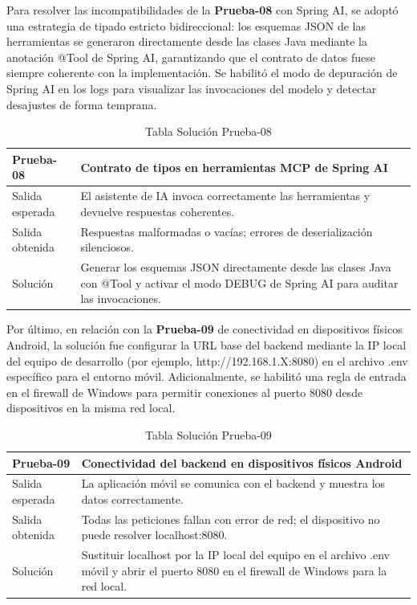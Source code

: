Para resolver las incompatibilidades de la \textbf{Prueba-08} con Spring AI, se adoptó una estrategia de tipado estricto bidireccional: los esquemas JSON de las herramientas se generaron directamente desde las clases Java mediante la anotación @Tool de Spring AI, garantizando que el contrato de datos fuese siempre coherente con la implementación. Se habilitó el modo de depuración de Spring AI en los logs para visualizar las invocaciones del modelo y detectar desajustes de forma temprana.

\begin{table}[H]
\centering
\begin{tabular}{|p{}|p{}|}
\hline
\textbf{Prueba-08} & \textbf{Contrato de tipos en herramientas MCP de Spring AI} \\ \hline
Salida esperada & El asistente de IA invoca correctamente las herramientas y devuelve respuestas coherentes. \\ \hline
Salida obtenida & Respuestas malformadas o vacías; errores de deserialización silenciosos. \\ \hline
Solución & Generar los esquemas JSON directamente desde las clases Java con @Tool y activar el modo DEBUG de Spring AI para auditar las invocaciones. \\ \hline
\end{tabular}
\caption{Tabla Solución Prueba-08}
\label{tab:sol_prueba08}
\end{table}

Por último, en relación con la \textbf{Prueba-09} de conectividad en dispositivos físicos Android, la solución fue configurar la URL base del backend mediante la IP local del equipo de desarrollo (por ejemplo, http://192.168.1.X:8080) en el archivo .env específico para el entorno móvil. Adicionalmente, se habilitó una regla de entrada en el firewall de Windows para permitir conexiones al puerto 8080 desde dispositivos en la misma red local.

\begin{table}[H]
\centering
\begin{tabular}{|p{}|p{}|}
\hline
\textbf{Prueba-09} & \textbf{Conectividad del backend en dispositivos físicos Android} \\ \hline
Salida esperada & La aplicación móvil se comunica con el backend y muestra los datos correctamente. \\ \hline
Salida obtenida & Todas las peticiones fallan con error de red; el dispositivo no puede resolver localhost:8080. \\ \hline
Solución & Sustituir localhost por la IP local del equipo en el archivo .env móvil y abrir el puerto 8080 en el firewall de Windows para la red local. \\ \hline
\end{tabular}
\caption{Tabla Solución Prueba-09}
\label{tab:sol_prueba09}
\end{table}
